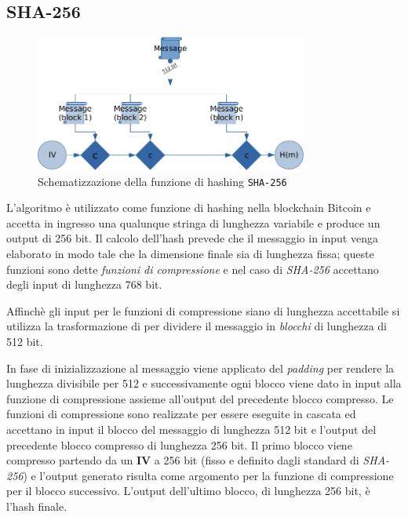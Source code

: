 \subsection{SHA-256}
\begin{figure}
    \centering
    \includegraphics[width=0.8\textwidth]{images/sha256.png}
    \caption{Schematizzazione della funzione di hashing \texttt{SHA-256}}
\end{figure}
L'algoritmo  è utilizzato come funzione di hashing nella blockchain Bitcoin e accetta in ingresso una qualunque stringa di lunghezza variabile e produce un output di 256 bit.\newline
Il calcolo dell'hash prevede che il messaggio in input venga elaborato in modo tale che la dimensione finale sia di lunghezza fissa; queste funzioni sono dette \textit{funzioni di compressione} e nel caso di \textit{SHA-256} accettano degli input di lunghezza 768 bit.

Affinchè gli input per le funzioni di compressione siano di lunghezza accettabile si utilizza la trasformazione di  per dividere il messaggio in \textit{blocchi} di lunghezza di 512 bit.

In fase di inizializzazione al messaggio viene applicato del \textit{padding} per rendere la lunghezza divisibile per 512 e successivamente ogni blocco viene dato in input alla funzione di compressione assieme all'output del precedente blocco compresso. Le funzioni di compressione sono realizzate per essere eseguite in cascata ed accettano in input il blocco del messaggio di lunghezza 512 bit e l'output del precedente blocco compresso di lunghezza 256 bit.\newline
Il primo blocco viene compresso partendo da un  \textbf{IV} a 256 bit (fisso e definito dagli standard di \textit{SHA-256}) e l'output generato risulta come argomento per la funzione di compressione per il blocco successivo. L'output dell'ultimo blocco, di lunghezza 256 bit, è l'hash finale.

